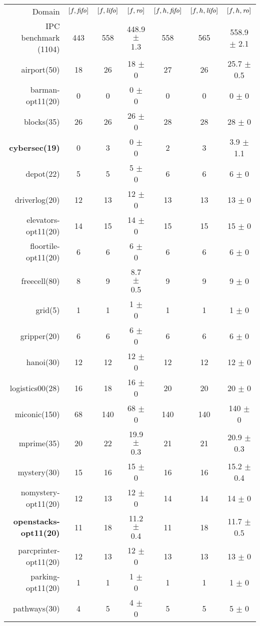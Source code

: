 \begin{center}
\begin{tabular}{|r|*{2}{ccc|}}
Domain & \([f,{\text{\textit{fifo}}}]\) & \([f,{\text{\textit{lifo}}}]\) & \([f,{\text{\textit{ro}}}]\) & \([f,h,{\text{\textit{fifo}}}]\) & \([f,h,{\text{\textit{lifo}}}]\) & \([f,h,{\text{\textit{ro}}}]\)\\
IPC benchmark (1104) & 443 & 558 & 448.9 \(\pm\) 1.3 & 558 & 565 & 558.9 \(\pm\) 2.1\\
airport(50) & 18 & 26 & 18 \(\pm\) 0 & 27 & 26 & 25.7 \(\pm\) 0.5\\
barman-opt11(20) & 0 & 0 & 0 \(\pm\) 0 & 0 & 0 & 0 \(\pm\) 0\\
blocks(35) & 26 & 26 & 26 \(\pm\) 0 & 28 & 28 & 28 \(\pm\) 0\\
\textbf{cybersec(19)} & 0 & 3 & 0 \(\pm\) 0 & 2 & 3 & 3.9 \(\pm\) 1.1\\
depot(22) & 5 & 5 & 5 \(\pm\) 0 & 6 & 6 & 6 \(\pm\) 0\\
driverlog(20) & 12 & 13 & 12 \(\pm\) 0 & 13 & 13 & 13 \(\pm\) 0\\
elevators-opt11(20) & 14 & 15 & 14 \(\pm\) 0 & 15 & 15 & 15 \(\pm\) 0\\
floortile-opt11(20) & 6 & 6 & 6 \(\pm\) 0 & 6 & 6 & 6 \(\pm\) 0\\
freecell(80) & 8 & 9 & 8.7 \(\pm\) 0.5 & 9 & 9 & 9 \(\pm\) 0\\
grid(5) & 1 & 1 & 1 \(\pm\) 0 & 1 & 1 & 1 \(\pm\) 0\\
gripper(20) & 6 & 6 & 6 \(\pm\) 0 & 6 & 6 & 6 \(\pm\) 0\\
hanoi(30) & 12 & 12 & 12 \(\pm\) 0 & 12 & 12 & 12 \(\pm\) 0\\
logistics00(28) & 16 & 18 & 16 \(\pm\) 0 & 20 & 20 & 20 \(\pm\) 0\\
miconic(150) & 68 & 140 & 68 \(\pm\) 0 & 140 & 140 & 140 \(\pm\) 0\\
mprime(35) & 20 & 22 & 19.9 \(\pm\) 0.3 & 21 & 21 & 20.9 \(\pm\) 0.3\\
mystery(30) & 15 & 16 & 15 \(\pm\) 0 & 16 & 16 & 15.2 \(\pm\) 0.4\\
nomystery-opt11(20) & 12 & 13 & 12 \(\pm\) 0 & 14 & 14 & 14 \(\pm\) 0\\
\textbf{openstacks-opt11(20)} & 11 & 18 & 11.2 \(\pm\) 0.4 & 11 & 18 & 11.7 \(\pm\) 0.5\\
parcprinter-opt11(20) & 12 & 13 & 12 \(\pm\) 0 & 13 & 13 & 13 \(\pm\) 0\\
parking-opt11(20) & 1 & 1 & 1 \(\pm\) 0 & 1 & 1 & 1 \(\pm\) 0\\
pathways(30) & 4 & 5 & 4 \(\pm\) 0 & 5 & 5 & 5 \(\pm\) 0\\

\end{tabular}
\end{center}
